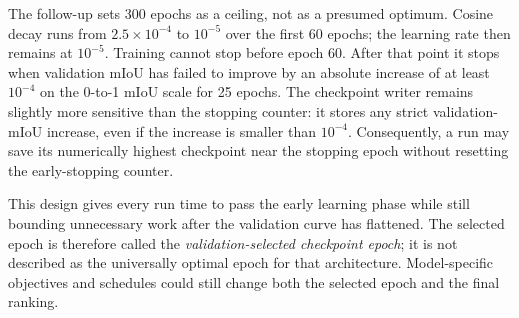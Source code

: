 The follow-up sets 300 epochs as a ceiling, not as a presumed optimum. Cosine
decay runs from $2.5\times10^{-4}$ to $10^{-5}$ over the first 60 epochs; the
learning rate then remains at $10^{-5}$. Training cannot stop before epoch 60.
After that point it stops when validation mIoU has failed to improve by an
absolute increase of at least $10^{-4}$ on the 0-to-1 mIoU scale for 25
epochs. The checkpoint writer remains slightly more
sensitive than the stopping counter: it stores any strict validation-mIoU
increase, even if the increase is smaller than $10^{-4}$. Consequently, a
run may save its numerically highest checkpoint near the stopping epoch
without resetting the early-stopping counter.

This design gives every run time to pass the early learning phase while still
bounding unnecessary work after the validation curve has flattened. The
selected epoch is therefore called the \emph{validation-selected checkpoint
epoch}; it is not described as the universally optimal epoch for that
architecture. Model-specific objectives and schedules could still change both
the selected epoch and the final ranking.
